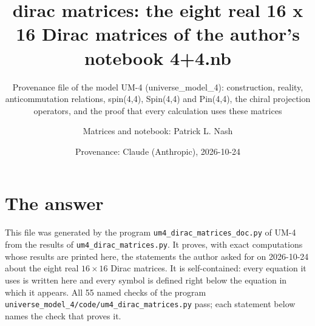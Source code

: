 \documentclass[
  10pt,
]{article}
\title{dirac matrices: the eight real 16 x 16 Dirac matrices of the
author's notebook 4+4.nb}
\subtitle{Provenance file of the model UM-4 (universe\_model\_4):
construction, reality, anticommutation relations, spin(4,4), Spin(4,4)
and Pin(4,4), the chiral projection operators, and the proof that every
calculation uses these matrices}
\author{Matrices and notebook: Patrick L. Nash \and Provenance: Claude
(Anthropic), 2026-10-24}
\date{}
\begin{document}
\maketitle

{
\hypersetup{linkcolor=}
\setcounter{tocdepth}{3}
\tableofcontents
}
\hypertarget{the-answer}{%
\section{The answer}\label{the-answer}}

This file was generated by the program
\texttt{um4\_dirac\_matrices\_doc.py} of UM-4 from the results of
\texttt{um4\_dirac\_matrices.py}. It proves, with exact computations
whose results are printed here, the statements the author asked for on
2026-10-24 about the eight real \(16 \times 16\) Dirac matrices. It is
self-contained: every equation it uses is written here and every symbol
is defined right below the equation in which it appears. All 55 named
checks of the program
\texttt{universe\_model\_4/code/um4\_dirac\_matrices.py} pass; each
statement below names the check that proves it.
\end{document}
